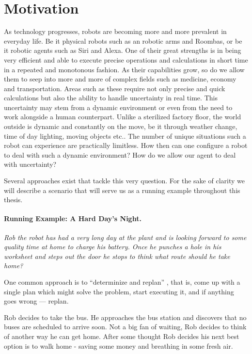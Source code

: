 \section{Motivation}
\label{intro: Motivation}

As technology progresses, robots are becoming more and more prevalent in everyday life. Be it physical robots such as an robotic arms and Roombas, or be it robotic agents such as Siri and Alexa. One of their great strengths is in being very efficient and able to execute precise operations and calculations in short time in a repeated and monotonous fashion. As their capabilities grow, so do we allow them to seep into more and more of complex fields such as medicine, economy and transportation. Areas such as these require not only precise and quick calculations but also the ability to handle uncertainty in real time. This uncertainty may stem from a dynamic environment or even from the need to work alongside a human counterpart.
Unlike a sterilized factory floor, the world outside is dynamic and constantly on the move, be it through weather change, time of day lighting, moving objects etc.. 
The number of unique situations such a robot can experience are practically limitless.
How then can one configure a robot to deal with such a dynamic environment? How do we allow our agent to deal with uncertainty?

Several approaches exist that tackle this very question. For the sake of clarity we will describe a scenario that will serve us as a running example throughout this thesis.

\begin{tcolorbox}[colback=red!5!white,colframe=red!75!black]
  \paragraph{Running Example: A Hard Day's Night.} \textit{Rob the robot has had a very long day at the plant and is looking forward to some quality time at home to charge his battery. Once he punches a hole in his worksheet and steps out the door he stops to think what route should he take home?}
\end{tcolorbox}

One common approach is to ``determinize and replan'' \cite{yoon2007ff}, that is, come up with a single plan which might solve the problem, start executing it, and if anything goes wrong --- replan.

\begin{tcolorbox}[colback=red!5!white,colframe=red!75!black]
  Rob decides to take the bus. He approaches the bus station and discovers that no buses are scheduled to arrive soon. Not a big fan of waiting, Rob decides to think of another way he can get home. After some thought Rob decides his next best option is to walk home - saving some money and breathing in some fresh air.
\end{tcolorbox}

